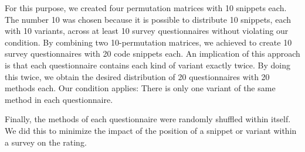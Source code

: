 \documentclass[%
class=scrreprt,
chapterprefix=false,%
open=right,%
twoside=false,%
paper=a4,%
logofile={Logo\_zentral\_farbig\_EN.png},%
thesistype=master,%
UKenglish,%
]{se2thesis}
\theoremstyle{definition}
\newcommand{\rdh}{REDEC\xspace}
\begin{document}
	For this purpose, we created four permutation matrices with 10 snippets each. The number 10 was chosen because it is possible to distribute 10 snippets, each with 10 variants, across at least 10 survey questionnaires without violating our condition. By combining two 10-permutation matrices, we achieved to create 10 survey questionnaires with 20 code snippets each. An implication of this approach is that each questionnaire contains each kind of variant exactly twice. By doing this twice, we obtain the desired distribution of 20 questionnaires with 20 methods each. Our condition applies: There is only one variant of the same method in each questionnaire.
		
	Finally, the methods of each questionnaire were randomly shuffled within itself. We did this to minimize the impact of the position of a snippet or variant within a survey on the rating.

	
\end{document}
